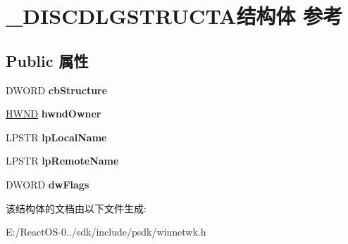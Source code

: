 \hypertarget{struct___d_i_s_c_d_l_g_s_t_r_u_c_t_a}{}\section{\+\_\+\+D\+I\+S\+C\+D\+L\+G\+S\+T\+R\+U\+C\+T\+A结构体 参考}
\label{struct___d_i_s_c_d_l_g_s_t_r_u_c_t_a}
\subsection*{Public 属性}
\begin{DoxyCompactItemize}
\item 
\mbox{\label{struct___d_i_s_c_d_l_g_s_t_r_u_c_t_a_a62286a7b2cc6170bbc8755680d3bc55b}} 
D\+W\+O\+RD {\bfseries cb\+Structure}
\item 
\mbox{\label{struct___d_i_s_c_d_l_g_s_t_r_u_c_t_a_aa7310b2bd53ddd54718f1027d44ca2d8}} 
\hyperlink{interfacevoid}{H\+W\+ND} {\bfseries hwnd\+Owner}
\item 
\mbox{\label{struct___d_i_s_c_d_l_g_s_t_r_u_c_t_a_ae94278ab2026368fdd8c0269fdf48725}} 
L\+P\+S\+TR {\bfseries lp\+Local\+Name}
\item 
\mbox{\label{struct___d_i_s_c_d_l_g_s_t_r_u_c_t_a_a646fb7fc7bd9da03d662b9a376a89bb1}} 
L\+P\+S\+TR {\bfseries lp\+Remote\+Name}
\item 
\mbox{\label{struct___d_i_s_c_d_l_g_s_t_r_u_c_t_a_a5c759a38a5b9b2badf142c53c6899cdd}} 
D\+W\+O\+RD {\bfseries dw\+Flags}
\end{DoxyCompactItemize}


该结构体的文档由以下文件生成\+:\begin{DoxyCompactItemize}
\item 
E\+:/\+React\+O\+S-\/0../sdk/include/psdk/winnetwk.\+h\end{DoxyCompactItemize}
